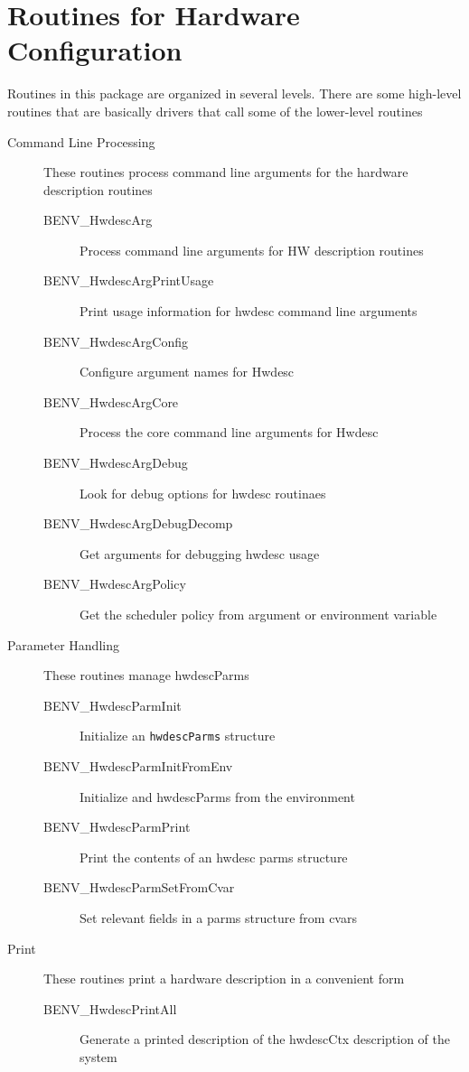\documentclass[11pt,letterpaper]{report}
\begin{document}
\section{Routines for Hardware Configuration}
Routines in this package are organized in several levels. There are
some high-level routines that are basically drivers that call some of
the lower-level routines

\begin{description}
\item[Command Line Processing]These routines process command line
  arguments for the hardware description routines
 \begin{description}
 \item[BENV\_HwdescArg]Process command line arguments for HW
   description routines
 \item[BENV\_HwdescArgPrintUsage]Print usage information for hwdesc
  command line arguments
 \item[BENV\_HwdescArgConfig]Configure argument names for Hwdesc
 \item[BENV\_HwdescArgCore]Process the core command line arguments for Hwdesc
 \item[BENV\_HwdescArgDebug]Look for debug options for hwdesc routinaes
 \item[BENV\_HwdescArgDebugDecomp]Get arguments for debugging hwdesc usage
 \item[BENV\_HwdescArgPolicy]Get the scheduler policy from argument or
  environment variable
 \end{description}
\item[Parameter Handling]These routines manage hwdescParms
 \begin{description}
 \item[BENV\_HwdescParmInit]Initialize an \texttt{hwdescParms} structure
 \item[BENV\_HwdescParmInitFromEnv]Initialize and hwdescParms from the
  environment
 \item[BENV\_HwdescParmPrint]Print the contents of an hwdesc parms structure
 \item[BENV\_HwdescParmSetFromCvar]Set relevant fields in a parms
  structure from cvars
 \end{description}
\item[Print]These routines print a hardware description in a
  convenient form
 \begin{description}
 \item[BENV\_HwdescPrintAll]Generate a printed description of the
  hwdescCtx description of the system

\end{description}
\end{description}
\end{document}
